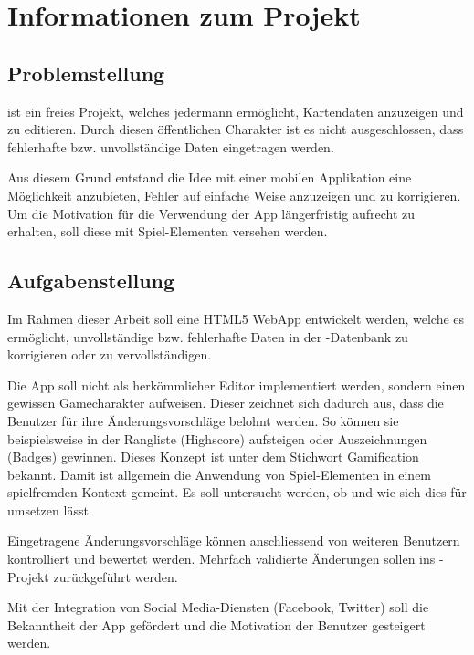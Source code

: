 \chapter{Informationen zum Projekt}
\label{informationen-projekt}


\section{Problemstellung}
 ist ein freies Projekt, welches jedermann ermöglicht, Kartendaten anzuzeigen und zu editieren.
Durch diesen öffentlichen Charakter ist es nicht ausgeschlossen, dass fehlerhafte bzw. unvollständige Daten eingetragen werden.

Aus diesem Grund entstand die Idee mit einer mobilen Applikation eine Möglichkeit anzubieten, Fehler auf einfache Weise anzuzeigen und zu korrigieren.
Um die Motivation für die Verwendung der App längerfristig aufrecht zu erhalten, soll diese mit Spiel-Elementen versehen werden.

\section{Aufgabenstellung}
Im Rahmen dieser Arbeit soll eine HTML5 \gls{WebApp} entwickelt werden, welche es ermöglicht, unvollständige bzw. fehlerhafte Daten in der -Datenbank zu korrigieren oder zu vervollständigen.

Die App soll nicht als herkömmlicher Editor implementiert werden, sondern einen gewissen Gamecharakter aufweisen.
Dieser zeichnet sich dadurch aus, dass die Benutzer für ihre Änderungsvorschläge belohnt werden.
So können sie beispielsweise in der Rangliste (Highscore) aufsteigen oder Auszeichnungen (Badges) gewinnen.
Dieses Konzept ist unter dem Stichwort \gls{Gamification} bekannt.
Damit ist allgemein die Anwendung von Spiel-Elementen in einem spielfremden Kontext gemeint.
Es soll untersucht werden, ob und wie sich dies für  umsetzen lässt.

Eingetragene Änderungsvorschläge können anschliessend von weiteren Benutzern kontrolliert und bewertet werden.
Mehrfach validierte Änderungen sollen ins -Projekt zurückgeführt werden.

Mit der Integration von Social Media-Diensten (Facebook, Twitter) soll die Bekanntheit der App gefördert und die Motivation der Benutzer gesteigert werden.

